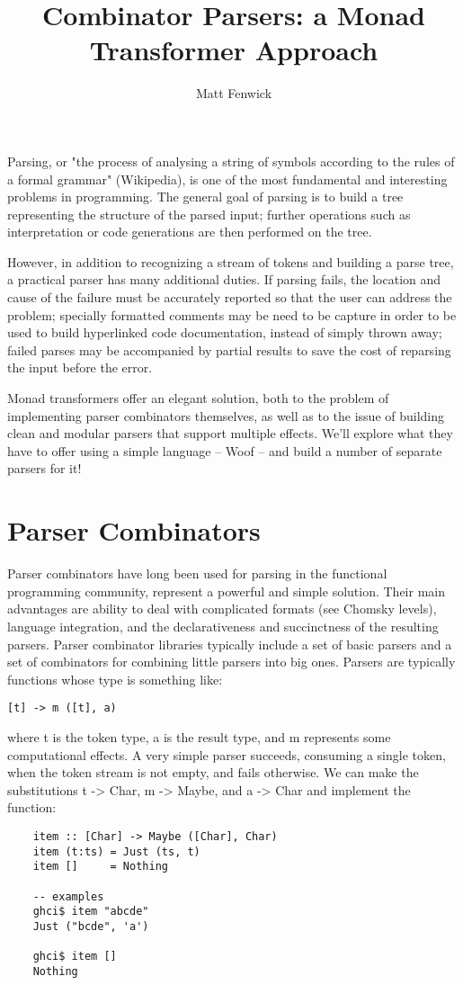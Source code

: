 \documentclass{tmr}
\title{Combinator Parsers:  a Monad Transformer Approach}
\author{Matt Fenwick\email{mfenwick100@gmail.com}}
\begin{document}
\begin{introduction}
Parsing, or "the process of analysing a 
string of symbols according to the rules of a formal grammar" (Wikipedia),
is one of the most fundamental and interesting problems in programming.
The general goal of parsing is to build a tree representing the structure
of the parsed input; further operations such as interpretation or
code generations are then performed on the tree.

However, in addition to recognizing a stream of tokens and building a parse
tree, a practical parser has many additional duties.  If parsing fails,
the location and cause of the failure must be accurately reported so that
the user can address the problem; specially formatted comments may be need
to be capture in order to be used
to build hyperlinked code documentation, instead of simply thrown away; 
failed parses may be accompanied by partial results to save the cost
of reparsing the input before the error.

Monad transformers offer an elegant solution, both to the problem of 
implementing parser combinators themselves, as well as to the issue of
building clean and modular parsers that support multiple effects.
We'll explore what they have to offer using a simple language -- Woof --
and build a number of separate parsers for it!
\end{introduction}


\section{Parser Combinators}
Parser combinators have long been used for parsing in the 
functional programming community, represent a powerful and simple solution.
Their main advantages are ability to deal with complicated formats (see
Chomsky levels), language integration, and the declarativeness and
succinctness of the resulting parsers.
Parser combinator libraries typically include a set of basic parsers and a
set of combinators for combining little parsers into big ones.  Parsers are
typically functions whose type is something like:
\begin{verbatim}
[t] -> m ([t], a)
\end{verbatim}
where t is the token type, a is the result type, and m represents some
computational effects.
A very simple parser succeeds, consuming a single token, when the token stream
is not empty, and fails otherwise.  We can make the substitutions t -> Char,
m -> Maybe, and a -> Char and implement the function:
\begin{verbatim}
    item :: [Char] -> Maybe ([Char], Char)
    item (t:ts) = Just (ts, t)
    item []     = Nothing
    
    -- examples
    ghci$ item "abcde"
    Just ("bcde", 'a')
    
    ghci$ item []
    Nothing
\end{verbatim}
\end{document}
